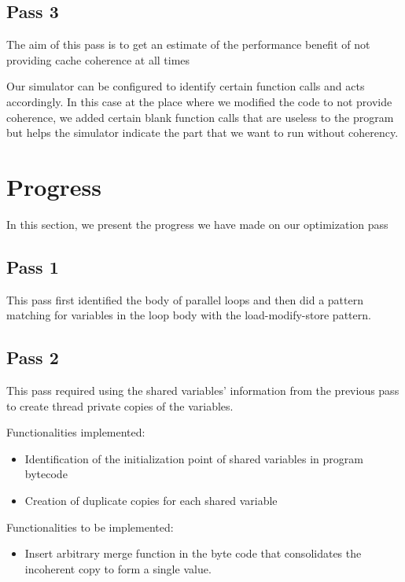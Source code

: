 \documentclass[12pt,conference]{IEEEtran}
\begin{document}
\subsection{Pass 3}

The aim of this pass is to get an estimate of the performance
benefit of not providing cache coherence at all times

Our simulator can be configured to identify certain function calls and acts accordingly. In this case at the place where we modified the code to not provide coherence, we added certain blank function calls that are useless to the program but helps the simulator indicate the part that we want to run without coherency.

\section{Progress}

In this section, we present the progress we have made on our 
optimization pass

\subsection{Pass 1}

This pass first identified the body of parallel loops and then did a pattern matching for variables in the loop body with the load-modify-store pattern.

\subsection{Pass 2}

This pass required using the shared variables' information from the previous pass 
to create thread private copies of the variables.

Functionalities implemented:
\begin{itemize}
\item Identification of the initialization point of shared variables in program bytecode
\item Creation of duplicate copies for each shared variable
\end{itemize}

Functionalities to be implemented:
\begin{itemize}
\item Insert arbitrary merge function in the byte code that consolidates the 
incoherent copy to form a single value.
\end{itemize}
\end{document}
